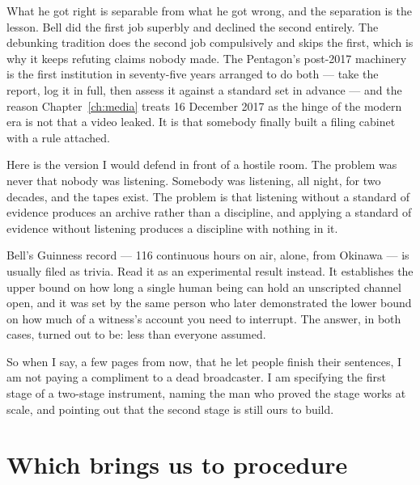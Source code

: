 What he got right is separable from what he got wrong, and the separation is the
lesson.  Bell did the
first job superbly and declined the second entirely. The debunking tradition does
the second job compulsively and skips the first, which is why it keeps refuting
claims nobody made. The Pentagon's post-2017 machinery is the first institution in
seventy-five years arranged to do both --- take the report, log it in full, then
assess it against a standard set in advance --- and the reason Chapter~\ref{ch:media}
treats 16 December 2017 as the hinge of the modern era is not that a video leaked.
It is that somebody finally built a filing cabinet with a rule attached.

Here is the version I would defend in front of a hostile room. The problem was never
that nobody was listening. Somebody was listening, all night, for two decades, and
the tapes exist. The problem is that listening without a standard of evidence
produces an archive rather than a discipline, and applying a standard of evidence
without listening produces a discipline with nothing in it. 

\begin{funfact}
Bell's Guinness record --- 116 continuous hours on air, alone, from Okinawa --- is
usually filed as trivia. Read it as an experimental result instead. It establishes
the upper bound on how long a single human being can hold an unscripted channel
open, and it was set by the same person who later demonstrated the lower bound on
how much of a witness's account you need to interrupt. The answer, in both cases,
turned out to be: less than everyone assumed.
\end{funfact}

So when I say, a few pages from now, that he let people finish their sentences, I
am not paying a compliment to a dead broadcaster. I am specifying the first stage
of a two-stage instrument, naming the man who proved the stage works at scale, and
pointing out that the second stage is still ours to build.

\section*{Which brings us to procedure}

